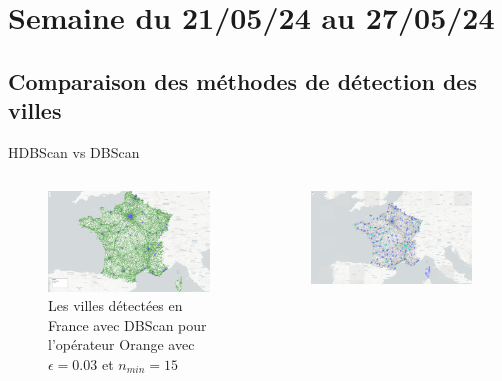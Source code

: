 \smallframetitle

\section{Semaine du 21/05/24 au 27/05/24}
\insertsectionframe

\subsection{Comparaison des méthodes de détection des villes}
\insertsubsectionframe

\begin{frame}{HDBScan vs DBScan}
    \begin{columns}
        \begin{column}{0.5\textwidth}
            \begin{figure}
                \includegraphics[width=0.4\paperwidth]{images/France-Villes-Orange_0.03_15.png}
                \caption{\label{fig:fr-vi-or-0.03-15}Les villes détectées en France avec DBScan pour l'opérateur Orange avec $\epsilon=0.03$ et $n_{min}=15$}
            \end{figure}
        \end{column}
        \begin{column}{0.5\textwidth}
            \begin{figure}
                \includegraphics[width=0.4\paperwidth]{images/villes_HDBSCAN.png}

\end{figure}
\end{column}
\end{columns}
\end{frame}
